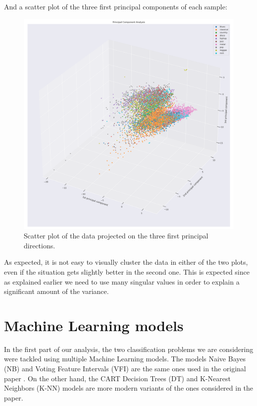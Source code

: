 \documentclass{Configuration_Files/PoliMi3i_thesis}
\begin{document}
And a scatter plot of the three first principal components of each sample:
\begin{figure}[H]
    \centering
    \includegraphics[width=\textwidth]{Figures/pca_3d.png}
    \caption{Scatter plot of the data projected on the three first principal directions.}
    \label{fig:pca3d}
\end{figure}

As expected, it is not easy to visually cluster the data in either of the two plots, even if the situation gets slightly better in the second one. This is expected since as explained earlier we need to use many singular values in order to explain a significant amount of the variance.


\chapter{Machine Learning models}
\label{ch:ml_models}%
In the first part of our analysis, the two classification problems we are considering were tackled using multiple Machine Learning models. The models Naive Bayes (NB) and Voting Feature Intervals (VFI) are the same ones used in the original paper \cite{original-paper}. On the other hand, the CART Decision Trees (DT) and K-Nearest Neighbors (K-NN) models are more modern variants of the ones considered in the paper.
\end{document}
